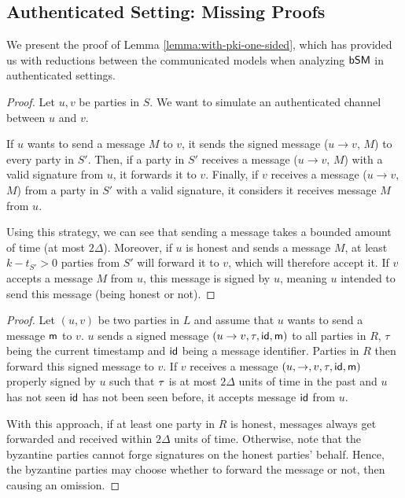\subsection{Authenticated Setting: Missing Proofs} \label{appendix:bipartite-pki}
We present the proof of Lemma \ref{lemma:with-pki-one-sided}, which has provided us with reductions between the communicated models when analyzing $\textsf{bSM}$ in authenticated settings.

\PKIOneSided*

\begin{proof}
Let $u,v$ be parties in $S$. We want to simulate an authenticated channel between $u$ and $v$.

If $u$ wants to send a message $M$ to $v$, it sends the signed message ($u \rightarrow v$, $M$) to every party in $S'$. Then, if a party in $S'$ receives a message ($u \rightarrow v$, $M$) with a valid signature from $u$, it forwards it to $v$. Finally, if $v$ receives a message ($u \rightarrow v$, $M$) from a party in $S'$ with a valid signature, it considers it receives message $M$ from $u$.

Using this strategy, we can see that sending a message takes a bounded amount of time (at most $2 \Delta$). Moreover, if $u$ is honest and sends a message $M$, at least $k - t_{S'} > 0$ parties from $S'$ will forward it to $v$, which will therefore accept it.
If $v$ accepts a message $M$ from $u$, this message is signed by $u$, meaning $u$ intended to send this message (being honest or not).
\end{proof}

\MagicOmissionsNew*
\begin{proof}
Let $(u,v)$ be two parties in $L$ and assume that $u$ wants to send a message $\textsf{m}$ to $v$. $u$ sends a signed message $(u \rightarrow v, \tau, \textsf{id}, \textsf{m})$ to all parties in $R$, $\tau$ being the current timestamp and $\textsf{id}$ being a message identifier. Parties in $R$ then forward this signed message to $v$. If $v$ receives a message $(u, \rightarrow, v, \tau, \textsf{id}, \textsf{m})$ properly signed by $u$ such that $\tau$ is at most $2\Delta$ units of time in the past and $u$ has not seen $\textsf{id}$ has not been seen before, it accepts message $\textsf{id}$ from $u$.

With this approach, if at least one party in $R$ is honest, messages always get forwarded and received within $2\Delta$ units of time. Otherwise, note that the byzantine parties cannot forge signatures on the honest parties' behalf. Hence, the byzantine parties may choose whether to forward the message or not, then causing an omission.
\end{proof}



